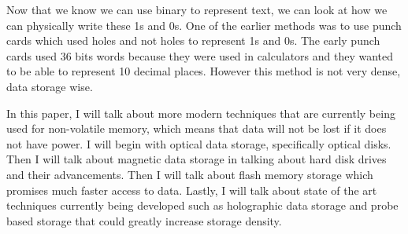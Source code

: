 \documentclass[ notitlepage, numerical, 11pt]{revtex4-1} %
\begin{document}
Now that we know we can use binary to represent text, we can look at how we can physically write these 1s and 0s. One of the earlier methods was to use punch cards which used holes and not holes to represent 1s and 0s. The early punch cards used 36 bits words because they were used in calculators and they wanted to be able to represent 10 decimal places. However this method is not very dense, data storage wise.


In this paper, I will talk about more modern techniques that are currently being used for non-volatile memory, which means that data will not be lost if it does not have power. I will begin with optical data storage, specifically optical disks. Then I will talk about magnetic data storage in talking about hard disk drives and their advancements. Then I will talk about flash memory storage which promises much faster access to data. Lastly, I will talk about state of the art techniques currently being developed such as holographic data storage and probe based storage that could greatly increase storage density.
\end{document}
